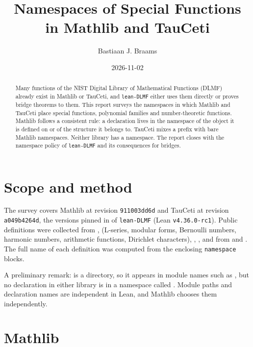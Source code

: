 \documentclass[11pt,a4paper]{article}
\begin{document}
\title{Namespaces of Special Functions\\in Mathlib and TauCeti}
\author{Bastiaan J. Braams}
\date{2026-11-02}
\maketitle

\begin{abstract}
  Many functions of the NIST Digital Library of Mathematical Functions (DLMF) already exist
  in Mathlib or TauCeti, and \texttt{lean-DLMF} either uses them directly or proves bridge
  theorems to them. This report surveys the namespaces in which Mathlib and TauCeti place
  special functions, polynomial families and number-theoretic functions. Mathlib follows a
  consistent rule: a declaration lives in the namespace of the object it is defined on or
  of the structure it belongs to. TauCeti mixes a  prefix with bare Mathlib
  namespaces. Neither library has a  namespace. The report closes with
  the namespace policy of \texttt{lean-DLMF} and its consequences for bridges.
\end{abstract}

\section{Scope and method}

The survey covers Mathlib at revision \texttt{911003dd6d} and TauCeti at revision
\texttt{a049b4264d}, the versions pinned in  of \texttt{lean-DLMF}
(Lean \texttt{v4.36.0-rc1}). Public definitions were collected from
,  (L-series, modular
forms, Bernoulli numbers, harmonic numbers, arithmetic functions, Dirichlet characters),
, , and from
 and . The full name of
each definition was computed from the enclosing \texttt{namespace} blocks.

A preliminary remark:  is a directory, so it appears in
module names such as , but no
declaration in either library is in a namespace called . Module paths
and declaration names are independent in Lean, and Mathlib chooses them independently.

\section{Mathlib}
\end{document}

